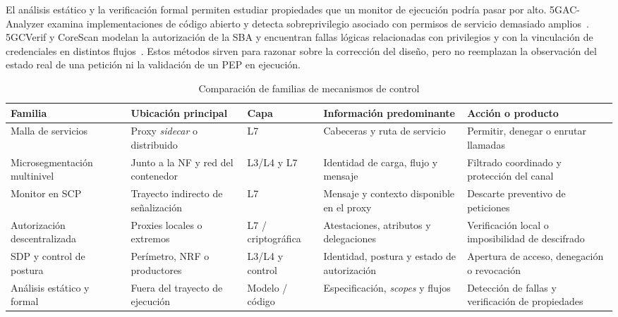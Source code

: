 El análisis estático y la verificación formal permiten estudiar propiedades que un monitor de ejecución podría pasar por alto. 5GAC-Analyzer examina implementaciones de código abierto y detecta sobreprivilegio asociado con permisos de servicio demasiado amplios~\cite{E0030}. 5GCVerif y CoreScan modelan la autorización de la SBA y encuentran fallas lógicas relacionadas con privilegios y con la vinculación de credenciales en distintos flujos~\cite{E0066,E0036}. Estos métodos sirven para razonar sobre la corrección del diseño, pero no reemplazan la observación del estado real de una petición ni la validación de un PEP en ejecución.

\begin{table}[H]
    \centering
    \caption{Comparación de familias de mecanismos de control}
    \label{tab:familias-control}
    \scriptsize
    \begin{singlespace}
    \begin{tabularx}{\textwidth}{@{}
        >{\raggedright\arraybackslash}p{2.8cm}
        >{\raggedright\arraybackslash}p{2.25cm}
        >{\raggedright\arraybackslash}p{1.55cm}
        >{\raggedright\arraybackslash}X
        >{\raggedright\arraybackslash}X@{}}
        \toprule
        Familia & Ubicación principal & Capa & Información predominante & Acción o producto \\
        \midrule
        Malla de servicios~\cite{E0005,E0004} & Proxy \textit{sidecar} o distribuido & L7 & Cabeceras y ruta de servicio & Permitir, denegar o enrutar llamadas \\
        Microsegmentación multinivel~\cite{E0019,E0045} & Junto a la NF y red del contenedor & L3/L4 y L7 & Identidad de carga, flujo y mensaje & Filtrado coordinado y protección del canal \\
        Monitor en SCP~\cite{E0061} & Trayecto indirecto de señalización & L7 & Mensaje y contexto disponible en el proxy & Descarte preventivo de peticiones \\
        Autorización descentralizada~\cite{E0069,E0012} & Proxies locales o extremos & L7 / criptográfica & Atestaciones, atributos y delegaciones & Verificación local o imposibilidad de descifrado \\
        SDP y control de postura~\cite{E0041,E0050} & Perímetro, NRF o productores & L3/L4 y control & Identidad, postura y estado de autorización & Apertura de acceso, denegación o revocación \\
        Análisis estático y formal~\cite{E0030,E0066,E0036} & Fuera del trayecto de ejecución & Modelo / código & Especificación, \textit{scopes} y flujos & Detección de fallas y verificación de propiedades \\
        \bottomrule
    \end{tabularx}
    \end{singlespace}
\end{table}

